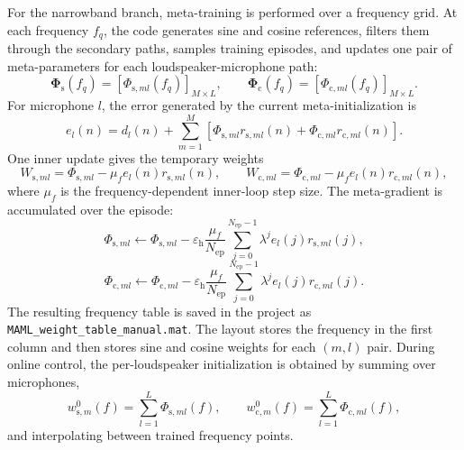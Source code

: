 \documentclass{internoise2026}
\begin{document}
For the narrowband branch, meta-training is performed over a frequency grid. At each frequency $f_q$, the code generates sine and cosine references, filters them through the secondary paths, samples training episodes, and updates one pair of meta-parameters for each loudspeaker-microphone path:
\begin{equation}
  \boldsymbol{\Phi}_{\mathrm{s}}(f_q)
  =
  \left[\Phi_{\mathrm{s},ml}(f_q)\right]_{M\times L},
  \qquad
  \boldsymbol{\Phi}_{\mathrm{c}}(f_q)
  =
  \left[\Phi_{\mathrm{c},ml}(f_q)\right]_{M\times L}.
  \label{eq:notch_phi}
\end{equation}
For microphone $l$, the error generated by the current meta-initialization is
\begin{equation}
  e_l(n)=d_l(n)
  +\sum_{m=1}^{M}
  \left[
  \Phi_{\mathrm{s},ml} r_{\mathrm{s},ml}(n)
  +\Phi_{\mathrm{c},ml} r_{\mathrm{c},ml}(n)
  \right].
  \label{eq:notch_meta_error}
\end{equation}
One inner update gives the temporary weights
\begin{equation}
  W_{\mathrm{s},ml} =
  \Phi_{\mathrm{s},ml}
  - \mu_f e_l(n)r_{\mathrm{s},ml}(n),
  \qquad
  W_{\mathrm{c},ml} =
  \Phi_{\mathrm{c},ml}
  - \mu_f e_l(n)r_{\mathrm{c},ml}(n),
  \label{eq:notch_inner}
\end{equation}
where $\mu_f$ is the frequency-dependent inner-loop step size. The meta-gradient is accumulated over the episode:
\begin{equation}
  \Phi_{\mathrm{s},ml}
  \leftarrow
  \Phi_{\mathrm{s},ml}
  -
  \varepsilon_{\mathrm{h}}
  \frac{\mu_f}{N_{\mathrm{ep}}}
  \sum_{j=0}^{N_{\mathrm{ep}}-1}
  \lambda^j e_l(j)r_{\mathrm{s},ml}(j),
  \label{eq:notch_meta_s}
\end{equation}
\begin{equation}
  \Phi_{\mathrm{c},ml}
  \leftarrow
  \Phi_{\mathrm{c},ml}
  -
  \varepsilon_{\mathrm{h}}
  \frac{\mu_f}{N_{\mathrm{ep}}}
  \sum_{j=0}^{N_{\mathrm{ep}}-1}
  \lambda^j e_l(j)r_{\mathrm{c},ml}(j).
  \label{eq:notch_meta_c}
\end{equation}
The resulting frequency table is saved in the project as \texttt{MAML\_weight\_table\_manual.mat}. The layout stores the frequency in the first column and then stores sine and cosine weights for each $(m,l)$ pair. During online control, the per-loudspeaker initialization is obtained by summing over microphones,
\begin{equation}
  w_{\mathrm{s},m}^{0}(f)=\sum_{l=1}^{L}\Phi_{\mathrm{s},ml}(f),
  \qquad
  w_{\mathrm{c},m}^{0}(f)=\sum_{l=1}^{L}\Phi_{\mathrm{c},ml}(f),
  \label{eq:sum_mics}
\end{equation}
and interpolating between trained frequency points.
\end{document}
